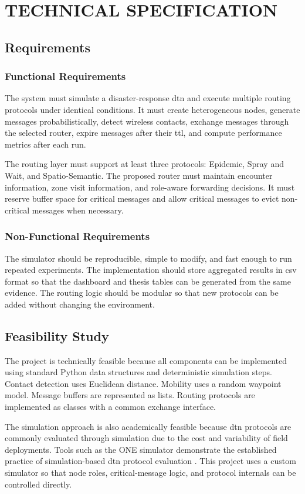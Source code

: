 \chapter{\MakeUppercase{Technical Specification}}

\section{Requirements}
\subsection{Functional Requirements}
The system must simulate a disaster-response \ac{dtn} and execute multiple routing protocols under identical conditions. It must create heterogeneous nodes, generate messages probabilistically, detect wireless contacts, exchange messages through the selected router, expire messages after their \ac{ttl}, and compute performance metrics after each run.

The routing layer must support at least three protocols: Epidemic, Spray and Wait, and Spatio-Semantic. The proposed router must maintain encounter information, zone visit information, and role-aware forwarding decisions. It must reserve buffer space for critical messages and allow critical messages to evict non-critical messages when necessary.

\subsection{Non-Functional Requirements}
The simulator should be reproducible, simple to modify, and fast enough to run repeated experiments. The implementation should store aggregated results in \ac{csv} format so that the dashboard and thesis tables can be generated from the same evidence. The routing logic should be modular so that new protocols can be added without changing the environment.

\section{Feasibility Study}
The project is technically feasible because all components can be implemented using standard Python data structures and deterministic simulation steps. Contact detection uses Euclidean distance. Mobility uses a random waypoint model. Message buffers are represented as lists. Routing protocols are implemented as classes with a common exchange interface.

The simulation approach is also academically feasible because \ac{dtn} protocols are commonly evaluated through simulation due to the cost and variability of field deployments. Tools such as the ONE simulator demonstrate the established practice of simulation-based \ac{dtn} protocol evaluation \citep{keranen2009one}. This project uses a custom simulator so that node roles, critical-message logic, and protocol internals can be controlled directly.


